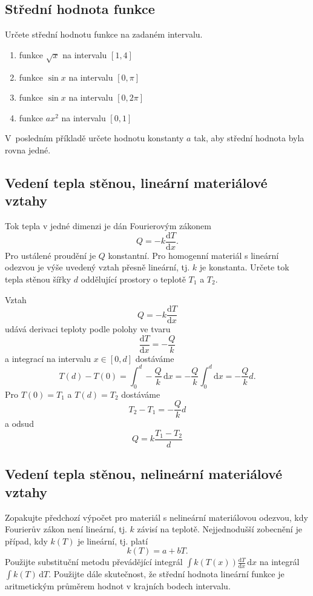 \stranka

\subsection{Střední hodnota funkce}
Určete střední hodnotu funkce na zadaném intervalu.

\begin{enumerate}[(1)]
\item funkce $\sqrt x$ na intervalu $[1,4]$
\item funkce $\sin x$ na intervalu $[0,\pi]$
\item funkce $\sin x$ na intervalu $[0,2\pi]$
\item funkce $ax^2$ na intervalu $[0,1]$
\end{enumerate}

V posledním příkladě určete hodnotu konstanty $a$ tak, aby střední hodnota byla rovna jedné.

\stranka
\subsection{Vedení tepla stěnou, lineární materiálové vztahy}

Tok tepla v jedné dimenzi je dán Fourierovým zákonem $$Q=-k\frac{\mathrm dT}{\mathrm dx}.$$ Pro ustálené proudění je $Q$ konstantní. Pro homogenní materiál s lineární odezvou je výše uvedený vztah přesně lineární, tj. $k$ je konstanta. Určete tok tepla stěnou šířky $d$ oddělující prostory o teplotě $T_1$ a $T_2$.

\reseni

Vztah
$$Q=-k\frac{\mathrm dT}{\mathrm dx}$$
udává derivaci teploty podle polohy ve tvaru
$$\frac{\mathrm dT}{\mathrm dx}=-\frac Qk$$
a integrací na intervalu $x\in [0,d]$ dostáváme
$$T(d)-T(0)=\int _0^d -\frac Qk\,\mathrm dx=-\frac Qk\int _0^d \mathrm dx=
-\frac Qk d.$$
Pro $T(0)=T_1$ a $T(d)=T_2$ dostáváme
$$T_2-T_1=-\frac Qk d$$
a odsud
$$Q=k\frac{T_1-T_2}d$$

\konec

\stranka
\subsection{Vedení tepla stěnou, nelineární materiálové vztahy}

Zopakujte předchozí výpočet pro materiál s nelineární materiálovou odezvou, kdy Fourierův zákon není lineární, tj. $k$ závisí na teplotě. Nejjednodušší zobecnění je případ, kdy $k(T)$ je lineární, tj. platí $$k(T)=a+bT.$$ Použijte substituční metodu převádějící integrál $\int k(T(x))\frac{\mathrm dT}{\mathrm dx}\,\mathrm dx$ na integrál $\int k(T)\,\mathrm dT.$ Použijte dále skutečnost, že střední hodnota lineární funkce je aritmetickým průměrem hodnot v krajních bodech intervalu.

